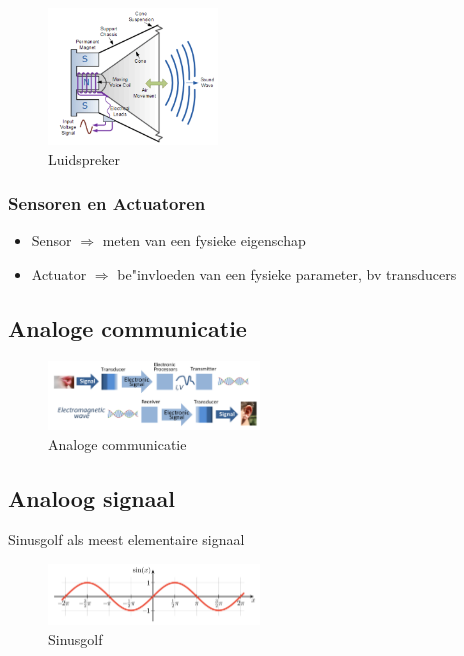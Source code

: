 \documentclass{article}
\begin{document}
\begin{figure}[H]
    \centering
    \includegraphics[width=0.4\textwidth]{Screenshot_20200315_111132.png}
    \caption{Luidspreker}
\end{figure}

\subsubsection{Sensoren en Actuatoren}
\begin{itemize}
    \item Sensor $\Rightarrow$ meten van een fysieke eigenschap
    \item Actuator $\Rightarrow$ be"invloeden van een fysieke parameter, bv transducers 
\end{itemize}

\subsection{Analoge communicatie}

\begin{figure}[H]
    \centering
    \includegraphics[width=0.5\textwidth]{Screenshot_20200315_111720.png}
    \caption{Analoge communicatie}
\end{figure}

\subsection{Analoog signaal}
Sinusgolf als meest elementaire signaal

\begin{figure}[H]
    \centering
    \includegraphics[width=0.5\textwidth]{Screenshot_20200315_113310.png}
    \caption{Sinusgolf}
\end{figure}
\end{document}
